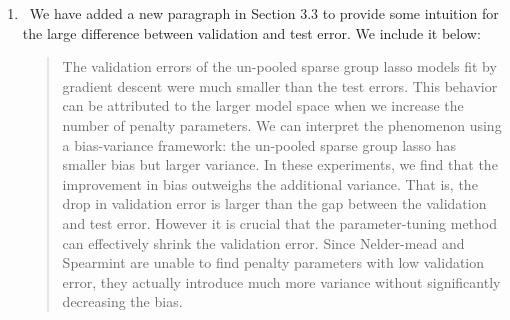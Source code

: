 \documentclass[]{article}
\newcommand{\reply}{\item[]\ }
\begin{document}
\begin{enumerate}
		\reply We have added a new paragraph in Section 3.3 to provide some intuition for the large difference between validation and test error. We include it below:
		\begin{quote}
			The validation errors of the un-pooled sparse group lasso models fit by gradient descent were much smaller than the test errors. This behavior can be attributed to the larger model space when we increase the number of penalty parameters. We can interpret the phenomenon using a bias-variance framework: the un-pooled sparse group lasso has smaller bias but larger variance. In these experiments, we find that the improvement in bias outweighs the additional variance. That is, the drop in validation error is larger than the gap between the validation and test error. However it is crucial that the parameter-tuning method can effectively shrink the validation error. Since Nelder-mead and Spearmint are unable to find penalty parameters with low validation error, they actually introduce much more variance without significantly decreasing the bias.
		\end{quote}
		
	\end{enumerate} 
	
\end{document}

